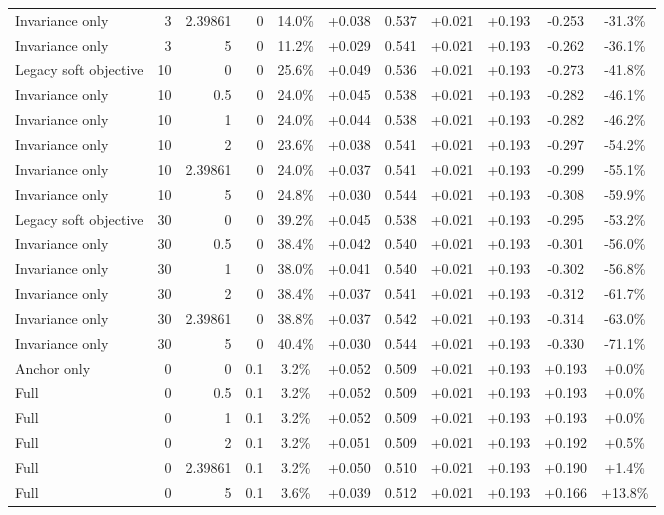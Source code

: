 \begin{table}[htbp]
\begin{tabular}{lrrrccccccc}
Invariance only & 3 & 2.39861 & 0 & 14.0\% & +0.038 & 0.537 & +0.021 & +0.193 & -0.253 & -31.3\% \\
Invariance only & 3 & 5 & 0 & 11.2\% & +0.029 & 0.541 & +0.021 & +0.193 & -0.262 & -36.1\% \\
Legacy soft objective & 10 & 0 & 0 & 25.6\% & +0.049 & 0.536 & +0.021 & +0.193 & -0.273 & -41.8\% \\
Invariance only & 10 & 0.5 & 0 & 24.0\% & +0.045 & 0.538 & +0.021 & +0.193 & -0.282 & -46.1\% \\
Invariance only & 10 & 1 & 0 & 24.0\% & +0.044 & 0.538 & +0.021 & +0.193 & -0.282 & -46.2\% \\
Invariance only & 10 & 2 & 0 & 23.6\% & +0.038 & 0.541 & +0.021 & +0.193 & -0.297 & -54.2\% \\
Invariance only & 10 & 2.39861 & 0 & 24.0\% & +0.037 & 0.541 & +0.021 & +0.193 & -0.299 & -55.1\% \\
Invariance only & 10 & 5 & 0 & 24.8\% & +0.030 & 0.544 & +0.021 & +0.193 & -0.308 & -59.9\% \\
Legacy soft objective & 30 & 0 & 0 & 39.2\% & +0.045 & 0.538 & +0.021 & +0.193 & -0.295 & -53.2\% \\
Invariance only & 30 & 0.5 & 0 & 38.4\% & +0.042 & 0.540 & +0.021 & +0.193 & -0.301 & -56.0\% \\
Invariance only & 30 & 1 & 0 & 38.0\% & +0.041 & 0.540 & +0.021 & +0.193 & -0.302 & -56.8\% \\
Invariance only & 30 & 2 & 0 & 38.4\% & +0.037 & 0.541 & +0.021 & +0.193 & -0.312 & -61.7\% \\
Invariance only & 30 & 2.39861 & 0 & 38.8\% & +0.037 & 0.542 & +0.021 & +0.193 & -0.314 & -63.0\% \\
Invariance only & 30 & 5 & 0 & 40.4\% & +0.030 & 0.544 & +0.021 & +0.193 & -0.330 & -71.1\% \\
Anchor only & 0 & 0 & 0.1 & 3.2\% & +0.052 & 0.509 & +0.021 & +0.193 & +0.193 & +0.0\% \\
Full & 0 & 0.5 & 0.1 & 3.2\% & +0.052 & 0.509 & +0.021 & +0.193 & +0.193 & +0.0\% \\
Full & 0 & 1 & 0.1 & 3.2\% & +0.052 & 0.509 & +0.021 & +0.193 & +0.193 & +0.0\% \\
Full & 0 & 2 & 0.1 & 3.2\% & +0.051 & 0.509 & +0.021 & +0.193 & +0.192 & +0.5\% \\
Full & 0 & 2.39861 & 0.1 & 3.2\% & +0.050 & 0.510 & +0.021 & +0.193 & +0.190 & +1.4\% \\
Full & 0 & 5 & 0.1 & 3.6\% & +0.039 & 0.512 & +0.021 & +0.193 & +0.166 & +13.8\% \\

\end{tabular}
\end{table}
